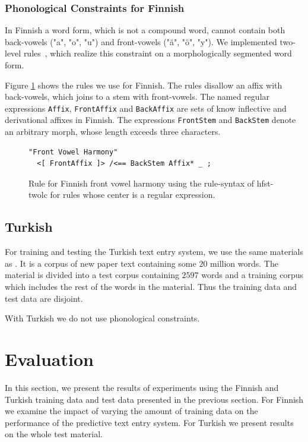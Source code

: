 \documentclass{llncs}
\begin{document}
\subsubsection{Phonological Constraints for Finnish}

In Finnish a word form, which is not a compound word, cannot contain
both back-vowels ("a", "o", "u") and front-vowels ("ä", "ö", "y"). We
implemented two-level rules~\cite{koskenniemi/1983}, which realize
this constraint on a morphologically segmented word form.

Figure \ref{fi-constraints} shows the rules we use for Finnish. The
rules disallow an affix with back-vowels, which joins to a stem with
front-vowels. The named regular expressions \verb|Affix|,
\verb|FrontAffix| and \verb|BackAffix| are sets of know inflective and
derivational affixes in Finnish. The expressions \verb|FrontStem| and
\verb|BackStem| denote an arbitrary morph, whose length exceeds three
characters.

\begin{figure}
\begin{verbatim}
"Front Vowel Harmony"
  <[ FrontAffix ]> /<== BackStem Affix* _ ; 
\end{verbatim}
\caption{Rule for Finnish front vowel harmony using the rule-syntax of hfst-twolc for rules whose center is a regular expression.}\label{fi-constraints}
\end{figure}

\subsection{Turkish}

For training and testing the Turkish text entry system, we use the
same materials as \cite{Tantug:2010}. It is a corpus of new paper text
containing some $20$ million words. The material is divided into a
test corpus containing $2597$ words and a training corpus which
includes the rest of the words in the material. Thus the training data
and test data are disjoint.

With Turkish we do not use phonological constraints.

\section{Evaluation}\label{evaluation}

In this section, we present the results of experiments using the
Finnish and Turkish training data and test data presented in the
previous section. For Finnish we examine the impact of varying the
amount of training data on the performance of the predictive text
entry system. For Turkish we present results on the whole test
material.
\end{document}
